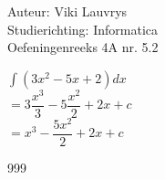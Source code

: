 \documentclass[a4paper]{article}
\begin{document}
  
\noindent \large Auteur: Viki	Lauvrys \\
\noindent \large Studierichting: Informatica\\
\noindent \large Oefeningenreeks 4A nr. 5.2\\

\medskip

\normalsize

$\displaystyle\int (3x^2 - 5x + 2) dx $ \\

$ = 3 \dfrac{x^3}{3} -5 \dfrac{x^2}{2} + 2x + c $ \\ 

$ =  x^3 - \dfrac{5x^2}{2} + 2x + c$ \\



\begin{thebibliography}{999}
\end{thebibliography}
\end{document}
